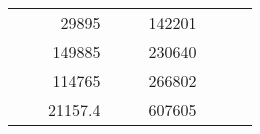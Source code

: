 \begin{table}[H]
\begin{tabular}{|ccrccrccc}
\multicolumn{1}{|c|}{\cellcolor[HTML]{FFFFC7}}                                & \multicolumn{1}{c|}{\cellcolor[HTML]{DDFDFF}}                      & \multicolumn{1}{r|}{\cellcolor[HTML]{DAE8FC}29895}     & \multicolumn{1}{c|}{\cellcolor[HTML]{FFFFC7}}                                & \multicolumn{1}{c|}{\cellcolor[HTML]{DDFDFF}}                       & \multicolumn{1}{r|}{\cellcolor[HTML]{DDFDFF}142201}    &                                                                              &                                                                    &                                                        \\ \cline{3-3} \cline{6-6}
\multicolumn{1}{|c|}{\cellcolor[HTML]{FFFFC7}}                                & \multicolumn{1}{c|}{\cellcolor[HTML]{DDFDFF}}                      & \multicolumn{1}{r|}{\cellcolor[HTML]{DDFDFF}149885}    & \multicolumn{1}{c|}{\cellcolor[HTML]{FFFFC7}}                                & \multicolumn{1}{c|}{\cellcolor[HTML]{DDFDFF}}                       & \multicolumn{1}{r|}{\cellcolor[HTML]{DAE8FC}230640}    &                                                                              &                                                                    &                                                        \\ \cline{3-3} \cline{6-6}
\multicolumn{1}{|c|}{\cellcolor[HTML]{FFFFC7}}                                & \multicolumn{1}{c|}{\cellcolor[HTML]{DDFDFF}}                      & \multicolumn{1}{r|}{\cellcolor[HTML]{DAE8FC}114765}    & \multicolumn{1}{c|}{\cellcolor[HTML]{FFFFC7}}                                & \multicolumn{1}{c|}{\cellcolor[HTML]{DDFDFF}}                       & \multicolumn{1}{r|}{\cellcolor[HTML]{DDFDFF}266802}    &                                                                              &                                                                    &                                                        \\ \cline{3-3} \cline{6-6}
\multicolumn{1}{|c|}{\cellcolor[HTML]{FFFFC7}}                                & \multicolumn{1}{c|}{\cellcolor[HTML]{DDFDFF}}                      & \multicolumn{1}{r|}{\cellcolor[HTML]{DDFDFF}21157.4}   & \multicolumn{1}{c|}{\cellcolor[HTML]{FFFFC7}}                                & \multicolumn{1}{c|}{\cellcolor[HTML]{DDFDFF}}                       & \multicolumn{1}{r|}{\cellcolor[HTML]{DAE8FC}607605}    &                                                                              &                                                                    &                                                        \\ \cline{3-3} \cline{6-6}

\end{tabular}
\end{table}
